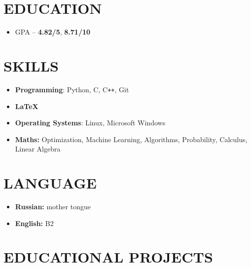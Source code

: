 \documentclass[12pt]{moderncv}
\begin{document}
    \makecvtitle

    \section{EDUCATION}

        \begin{itemize}
            \item GPA -- \textbf{4.82/5}, \textbf{8.71/10}
        \end{itemize}

    \section{SKILLS}
    
        \begin{itemize}
            \item \textbf{Programming}: Python, C, C\texttt{++}, Git
            \item \textbf{\LaTeX}
            \item \textbf{Operating Systems}: Linux, Microsoft Windows
            \item \textbf{Maths:} Optimization, Machine Learning, Algorithms, Probability, Calculus, Linear Algebra
        \end{itemize}

    \section{LANGUAGE}

        \begin{itemize}
            \item \textbf{Russian:} mother tongue
            \item \textbf{English:} B2
        \end{itemize}

    \section{EDUCATIONAL PROJECTS}
\end{document}
